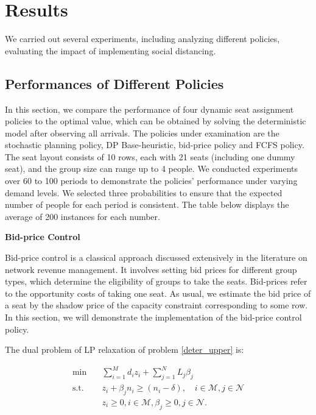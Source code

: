 \section{Results}
We carried out several experiments, including analyzing different policies, evaluating the impact of implementing social distancing.


\subsection{Performances of Different Policies}
In this section, we compare the performance of four dynamic seat assignment policies to the optimal value, which can be obtained by solving the deterministic model after observing all arrivals. The policies under examination are the stochastic planning policy, DP Base-heuristic, bid-price policy and FCFS policy. The seat layout consists of 10 rows, each with 21 seats (including one dummy seat), and the group size can range up to 4 people. We conducted experiments over 60 to 100 periods to demonstrate the policies' performance under varying demand levels. We selected three probabilities to ensure that the expected number of people for each period is consistent. The table below displays the average of 200 instances for each number.


{\bf{Bid-price Control}}

Bid-price control is a classical approach discussed extensively in the literature on network revenue management. It involves setting bid prices for different group types, which determine the eligibility of groups to take the seats. Bid-prices refer to the opportunity costs of taking one seat. As usual, we estimate the bid price of a seat by the shadow price of the capacity constraint corresponding to some row. In this section, we will demonstrate the implementation of the bid-price control policy. 

The dual problem of LP relaxation of problem \eqref{deter_upper} is:

\begin{equation}\label{bid-price_dual}
  \begin{aligned}
  \min \quad & \sum_{i=1}^{M} d_i z_i + \sum_{j= 1}^{N} L_j \beta_{j} \\
  \text {s.t.} \quad & z_{i} + \beta_j n_i \geq (n_i-\delta), \quad i \in \mathcal{M}, j \in \mathcal{N} \\
  & z_{i} \geq 0, i \in \mathcal{M}, \beta_{j} \geq 0, j \in \mathcal{N}.
  \end{aligned}
\end{equation}

